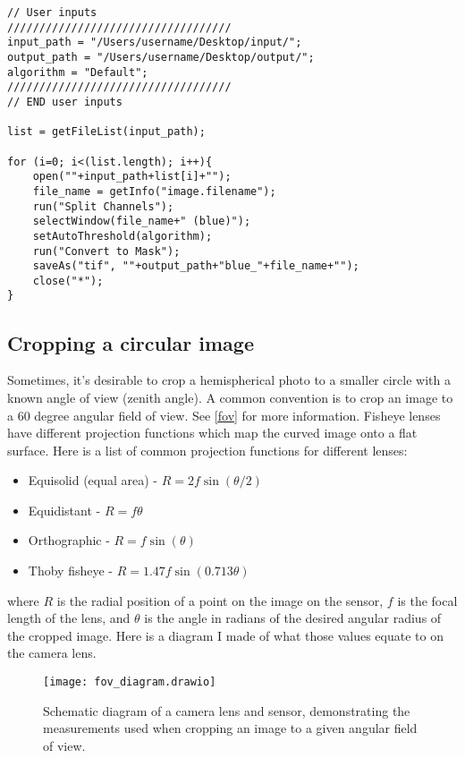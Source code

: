 \documentclass{article}
\newcommand\file[1]{\texttt{\underline{#1}}}
\begin{document}
\begin{minipage}{\linewidth}
\begin{lstlisting}[label=binarize_blue_channel, caption=ImageJ macro to binarize images by the blue colour channel. The macro can also be found in \file{binarize\_blue\_channel.ijm}.]
// User inputs
///////////////////////////////////
input_path = "/Users/username/Desktop/input/";
output_path = "/Users/username/Desktop/output/";
algorithm = "Default";
///////////////////////////////////
// END user inputs

list = getFileList(input_path);

for (i=0; i<(list.length); i++){
	open(""+input_path+list[i]+"");
	file_name = getInfo("image.filename");
	run("Split Channels");
	selectWindow(file_name+" (blue)");
	setAutoThreshold(algorithm);
	run("Convert to Mask");
	saveAs("tif", ""+output_path+"blue_"+file_name+"");
	close("*");
}
\end{lstlisting}
\end{minipage}

\subsection{Cropping a circular image} \label{circle}

Sometimes, it's desirable to crop a hemispherical photo to a smaller circle with a known angle of view (zenith angle). A common convention is to crop an image to a 60 degree angular field of view. See \autoref{fov} for more information. Fisheye lenses have different projection functions which map the curved image onto a flat surface. Here is a list of common projection functions for different lenses:

\begin{itemize}
	\item{Equisolid (equal area) - $R = 2f\sin{(\theta/2)}$}
	\item{Equidistant - $R = f\theta$}
	\item{Orthographic - $R = f\sin{(\theta)}$}
	\item{Thoby fisheye - $R = 1.47f\sin{(0.713\theta)}$}
\end{itemize}

where $R$ is the radial position of a point on the image on the sensor, $f$ is the focal length of the lens, and $\theta$ is the angle in radians of the desired angular radius of the cropped image. Here is a diagram I made of what those values equate to on the camera lens.

\begin{figure}[H]
\centering
	\texttt{[image: fov\_diagram.drawio]}
	\caption{Schematic diagram of a camera lens and sensor, demonstrating the measurements used when cropping an image to a given angular field of view.}
	\label{fov_diagram}
\end{figure}
\end{document}
